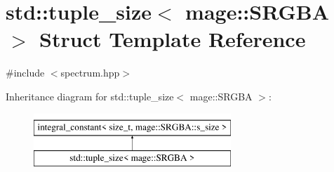 \hypertarget{structstd_1_1tuple__size_3_01mage_1_1_s_r_g_b_a_01_4}{}\section{std\+:\+:tuple\+\_\+size$<$ mage\+:\+:S\+R\+G\+BA $>$ Struct Template Reference}
\label{structstd_1_1tuple__size_3_01mage_1_1_s_r_g_b_a_01_4}


{\ttfamily \#include $<$spectrum.\+hpp$>$}

Inheritance diagram for std\+:\+:tuple\+\_\+size$<$ mage\+:\+:S\+R\+G\+BA $>$\+:\begin{figure}[H]
\begin{center}
\leavevmode
\includegraphics[height=2.000000cm]{structstd_1_1tuple__size_3_01mage_1_1_s_r_g_b_a_01_4}
\end{center}
\end{figure}
